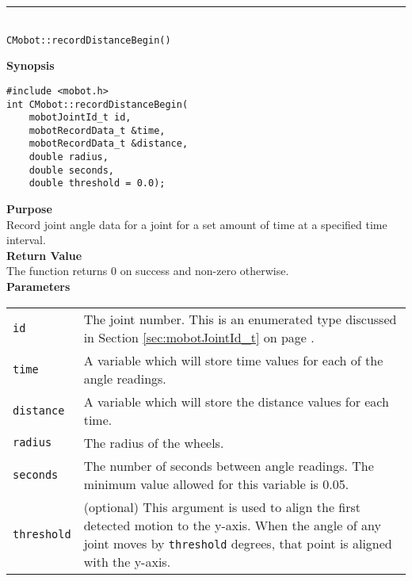 \noindent
\vspace{5pt}
\rule{4.5in}{0.015in}\\
\noindent
{\LARGE \texttt{CMobot::recordDistanceBegin()}}\\
{}

\noindent
{\bf Synopsis}
\vspace{-8pt}
\begin{verbatim}
#include <mobot.h>
int CMobot::recordDistanceBegin(
    mobotJointId_t id, 
    mobotRecordData_t &time, 
    mobotRecordData_t &distance, 
    double radius,
    double seconds, 
    double threshold = 0.0);
\end{verbatim}

\noindent
{\bf Purpose}\\
Record joint angle data for a joint for a set amount of time at a specified time interval.\\

\noindent
{\bf Return Value}\\
The function returns 0 on success and non-zero otherwise.\\

\noindent
{\bf Parameters}\\
\vspace{-0.1in}
\begin{description}
\item               
\begin{tabular}{p{15 mm}p{145 mm}}
\texttt{id} & The joint number. This is an enumerated type 
discussed in Section \ref{sec:mobotJointId_t} on page
\pageref{sec:mobotJointId_t}.\\
\texttt{time} & A variable which will store time values for each of the angle readings. \\
\texttt{distance} & A variable which will store the distance values for each time. \\
\texttt{radius} & The radius of the wheels. \\
\texttt{seconds} & The number of seconds between angle readings. The minimum value allowed for
this variable is 0.05. \\
\texttt{threshold} & (optional) This argument is used to align the first
detected motion to the y-axis. When the angle of any joint moves by
\texttt{threshold} degrees, that point is aligned with the y-axis.
\end{tabular}
\end{description}

